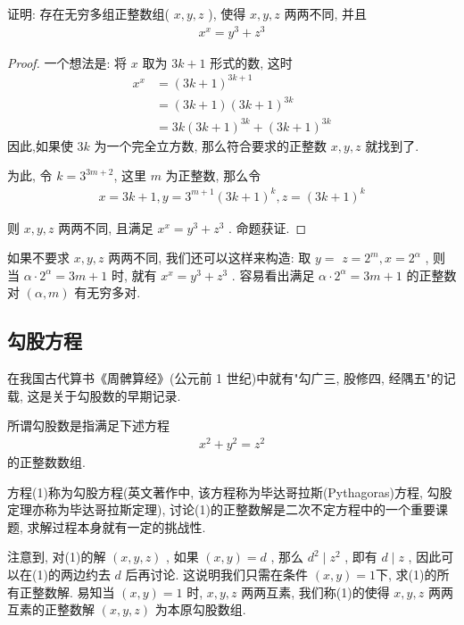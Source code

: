 \begin{example}
	证明: 存在无穷多组正整数组( $x, y, z$ ), 使得 $x, y, z$ 两两不同, 并且
	\begin{align*}
		x^{x}=y^{3}+z^{3}
	\end{align*}
\end{example}
\begin{proof}
	一个想法是: 将 $x$ 取为 $3 k+1$ 形式的数, 这时\begin{align}
		x^{x} & =(3 k+1)^{3 k+1}                \\
		      & =(3 k+1)(3 k+1)^{3 k}           \\
		      & =3 k(3 k+1)^{3 k}+(3 k+1)^{3 k}
	\end{align}
	因此,如果使 $3 k$ 为一个完全立方数, 那么符合要求的正整数 $x ,  y ,  z$ 就找到了.

	为此, 令 $k=3^{3 m+2}$, 这里 $m$ 为正整数, 那么令
	\begin{align*}
		x=3 k+1, y=3^{m+1}(3 k+1)^{k}, z=(3 k+1)^{k}
	\end{align*}

	则 $x ,  y ,  z$ 两两不同, 且满足 $x^{x}=y^{3}+z^{3}$ . 命题获证.
\end{proof}
\begin{note}
	如果不要求 $x ,  y ,  z$ 两两不同, 我们还可以这样来构造: 取 $y=$ $z=2^{m} ,  x=2^{\alpha}$ , 则当 $\alpha \cdot 2^{\alpha}=3 m+1$ 时, 就有 $x^{x}=y^{3}+z^{3}$ . 容易看出满足 $\alpha \cdot 2^{\alpha}=3 m+1$ 的正整数对 $(\alpha, m)$ 有无穷多对.
\end{note}

\subsection{勾股方程}
在我国古代算书《周髀算经》(公元前 1 世纪)中就有"勾广三, 股修四, 经隅五"的记载, 这是关于勾股数的早期记录.

所谓勾股数是指满足下述方程
\begin{align*}
	x^{2}+y^{2}=z^{2}
\end{align*}
的正整数数组.

方程(1)称为勾股方程(英文著作中, 该方程称为毕达哥拉斯(Pythagoras)方程, 勾股定理亦称为毕达哥拉斯定理), 讨论(1)的正整数解是二次不定方程中的一个重要课题, 求解过程本身就有一定的挑战性.

注意到, 对(1)的解 $(x, y, z)$ , 如果 $(x, y)=d$ , 那么 $d^{2} \mid z^{2}$ , 即有 $d \mid z$ , 因此可以在(1)的两边约去 $d$ 后再讨论. 这说明我们只需在条件 $(x, y)=1$下, 求(1)的所有正整数解. 易知当 $(x, y)=1$ 时,  $x ,  y ,  z$ 两两互素, 我们称(1)的使得 $x ,  y ,  z$ 两两互素的正整数解 $(x, y, z)$ 为本原勾股数组.

